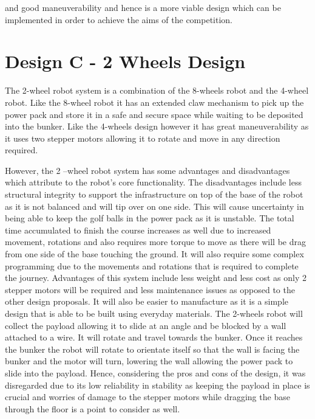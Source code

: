\documentclass[12pt]{report}
\begin{document}
and good maneuverability and hence is a more viable design which can be implemented in order
to achieve the aims of the competition.

\section{Design C - 2 Wheels Design}
The 2-wheel robot system is a combination of the 8-wheels robot and the 4-wheel robot. Like the 8-wheel robot it has an extended claw mechanism to pick up the power pack and store it in a safe and secure space while waiting to be deposited into the bunker. Like the 4-wheels design however it has great maneuverability as it uses two stepper motors allowing it to rotate and move in any direction required.

 However, the 2 –wheel robot system has some advantages and disadvantages which attribute to the robot’s core functionality.  The disadvantages include less structural integrity to support the infrastructure on top of the base of the robot as it is not balanced and will tip over on one side. This will cause uncertainty in being able to keep the golf balls in the power pack as it is unstable. The total time accumulated to finish the course increases as well due to increased movement, rotations and also requires more torque to move as there will be drag from one side of the base touching the ground. It will also require some complex programming due to the movements and rotations that is required to complete the journey. Advantages of this system include less weight and less cost as only 2 stepper motors will be required and less maintenance issues as opposed to the other design proposals. It will also be easier to manufacture as it is a simple design that is able to be built using everyday materials.
The 2-wheels robot will collect the payload allowing it to slide at an angle and be blocked by a wall attached to a wire. It will rotate and travel towards the bunker. Once it reaches the bunker the robot will rotate to orientate itself so that the wall is facing the bunker and the motor will turn, lowering the wall allowing the power pack to slide into the payload.
Hence, considering the pros and cons of the design, it was disregarded due to its low reliability in stability as keeping the payload in place is crucial and worries of damage to the stepper motors while dragging the base through the floor is a point to consider as well.
\end{document}
